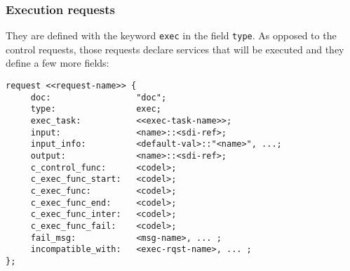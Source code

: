 \subsubsection{Execution requests}

They are defined with the keyword {\tt exec} in the field {\tt type}. As
opposed to the control requests, those requests declare services that
will be executed and they define a few more fields:

\begin{center}\begin{cartouche}\small\begin{verbatim}
request <<request-name>> {
     doc:                 "doc";
     type:                exec;
     exec_task:           <<exec-task-name>>; 
     input:               <name>::<sdi-ref>; 
     input_info:          <default-val>::"<name>", ...; 
     output:              <name>::<sdi-ref>; 
     c_control_func:      <codel>; 
     c_exec_func_start:   <codel>; 
     c_exec_func:         <codel>; 
     c_exec_func_end:     <codel>; 
     c_exec_func_inter:   <codel>; 
     c_exec_func_fail:    <codel>; 
     fail_msg:            <msg-name>, ... ; 
     incompatible_with:   <exec-rqst-name>, ... ; 
};
\end{verbatim}\end{cartouche}\end{center}

